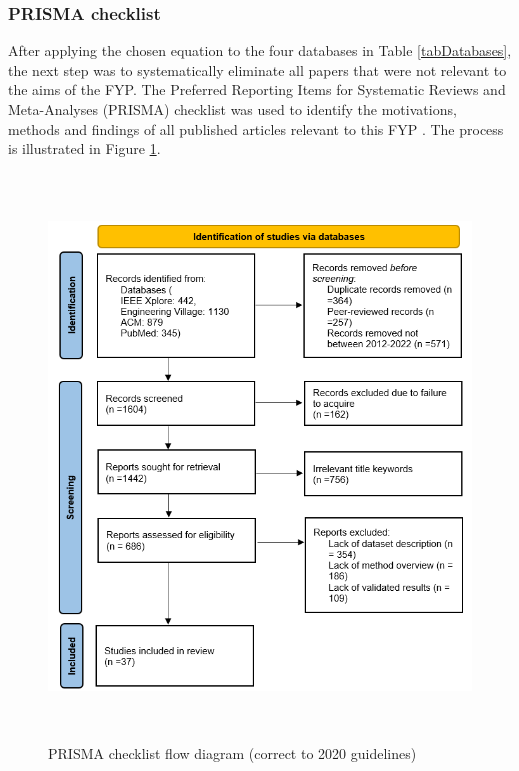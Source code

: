 \subsubsection{PRISMA checklist}
After applying the chosen equation to the four databases in Table \ref{tabDatabases}, the next step was to systematically eliminate all papers that 
were not relevant to the aims of the FYP. The Preferred Reporting Items for Systematic Reviews and Meta-Analyses (PRISMA) checklist was used to identify the 
motivations, methods and findings of all published articles relevant to this FYP \cite{prisma}. The process is illustrated in Figure \ref{prisma}.
\begin{figure}[H]
  \centering
  \includegraphics[width=15cm,height=15cm,keepaspectratio]{Background/prisma.png}
  \caption{PRISMA checklist flow diagram (correct to 2020 guidelines) \cite{prisma}}
  \label{prisma}
\end{figure} 

